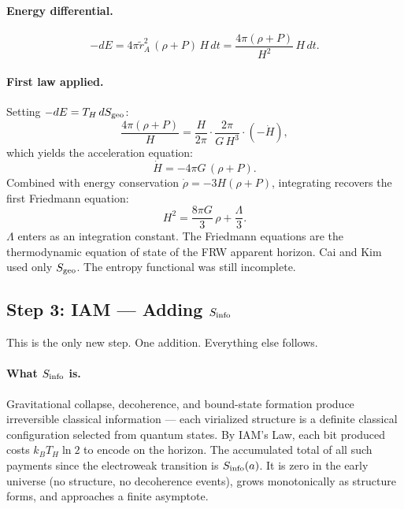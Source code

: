 \documentclass[12pt,a4paper]{article}
\begin{document}
\paragraph{Energy differential.}
\begin{equation}
-dE = 4\pi\tilde{r}_A^2\,(\rho + P)\,H\,dt
= \frac{4\pi(\rho + P)}{H^2}\,H\,dt.
\label{eq:dE_ck}
\end{equation}

\paragraph{First law applied.} Setting $-dE = T_H\,dS_{\rm geo}$:
\begin{equation}
\frac{4\pi(\rho + P)}{H} = \frac{H}{2\pi}\cdot\frac{2\pi}{G\,H^3}\cdot(-\dot{H}),
\end{equation}
which yields the acceleration equation:
\begin{equation}
\dot{H} = -4\pi G\,(\rho + P).
\label{eq:friedmann2_ck}
\end{equation}
Combined with energy conservation $\dot{\rho} = -3H(\rho + P)$, integrating
recovers the first Friedmann equation:
\begin{equation}
\boxed{H^2 = \frac{8\pi G}{3}\,\rho + \frac{\Lambda}{3}.}
\label{eq:friedmann1}
\end{equation}
$\Lambda$ enters as an integration constant. The Friedmann equations are the
thermodynamic equation of state of the FRW apparent horizon. Cai and Kim used
only $S_{\rm geo}$. The entropy functional was still incomplete.

\subsection{Step 3: IAM --- Adding $S_{\rm info}$}

This is the only new step. One addition. Everything else follows.

\paragraph{What $S_{\rm info}$ is.}
Gravitational collapse, decoherence, and bound-state formation produce
irreversible classical information --- each virialized structure is a definite
classical configuration selected from quantum states. By IAM's Law, each
bit produced costs $k_B T_H \ln 2$ to encode on the horizon. The accumulated
total of all such payments since the electroweak transition is $S_{\rm info}(a)$.
It is zero in the early universe (no structure, no decoherence events), grows
monotonically as structure forms, and approaches a finite asymptote.
\end{document}
